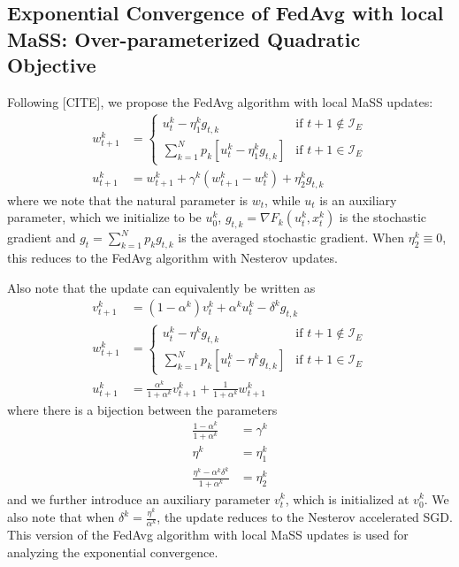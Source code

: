  \subsection{Exponential Convergence of FedAvg with local MaSS: Over-parameterized
 	Quadratic Objective}
 
 Following {[}CITE{]}, we propose the FedAvg algorithm with local MaSS
 updates: 
 \begin{align*}
 w_{t+1}^{k} & =\begin{cases}
 u_{t}^{k}-\eta_{1}^{k}g_{t,k} & \text{if }t+1\notin\mathcal{I}_{E}\\
 \sum_{k=1}^{N}p_{k}\left[u_{t}^{k}-\eta_{1}^{k}g_{t,k}\right] & \text{if }t+1\in\mathcal{I}_{E}
 \end{cases}\\
 u_{t+1}^{k} & =w_{t+1}^{k}+\gamma^{k}(w_{t+1}^{k}-w_{t}^{k})+\eta_{2}^{k}g_{t,k}
 \end{align*}
 where we note that the natural parameter is $w_{t}$, while $u_{t}$
 is an auxiliary parameter, which we initialize to be $u_{0}^{k}$,
 $g_{t,k}=\nabla F_{k}(u_{t}^{k},x_{t}^{k})$ is the stochastic gradient
 and $g_{t}=\sum_{k=1}^{N}p_{k}g_{t,k}$ is the averaged stochastic
 gradient. When $\eta_{2}^{k}\equiv0$, this reduces to the FedAvg
 algorithm with Nesterov updates.
 
 Also note that the update can equivalently be written as 
 \begin{align*}
 v_{t+1}^{k} & =(1-\alpha^{k})v_{t}^{k}+\alpha^{k}u_{t}^{k}-\delta^{k}g_{t,k}\\
 w_{t+1}^{k} & =\begin{cases}
 u_{t}^{k}-\eta^{k}g_{t,k} & \text{if }t+1\notin\mathcal{I}_{E}\\
 \sum_{k=1}^{N}p_{k}\left[u_{t}^{k}-\eta^{k}g_{t,k}\right] & \text{if }t+1\in\mathcal{I}_{E}
 \end{cases}\\
 u_{t+1}^{k} & =\frac{\alpha^{k}}{1+\alpha^{k}}v_{t+1}^{k}+\frac{1}{1+\alpha^{k}}w_{t+1}^{k}
 \end{align*}
 where there is a bijection between the parameters 
 \begin{align*}
 \frac{1-\alpha^{k}}{1+\alpha^{k}} & =\gamma^{k}\\
 \eta^{k} & =\eta_{1}^{k}\\
 \frac{\eta^{k}-\alpha^{k}\delta^{k}}{1+\alpha^{k}} & =\eta_{2}^{k}
 \end{align*}
 and we further introduce an auxiliary parameter $v_{t}^{k}$, which
 is initialized at $v_{0}^{k}$. We also note that when $\delta^{k}=\frac{\eta^{k}}{\alpha^{k}}$,
 the update reduces to the Nesterov accelerated SGD. This version of
 the FedAvg algorithm with local MaSS updates is used for analyzing
 the exponential convergence. 
 
